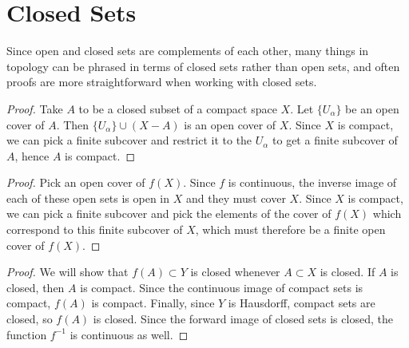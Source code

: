 


\section*{Closed Sets}

Since open and closed sets are complements of each other, many things in topology can be phrased in terms of closed sets rather than open sets, and often proofs are more straightforward when working with closed sets.


\begin{proof}
	Take $A$ to be a closed subset of a compact space $X$.  Let $\{U_\alpha\}$ be an open cover of $A$.  Then $\{U_\alpha\}\cup (X{-}A)$ is an open cover of $X$.  Since $X$ is compact, we can pick a finite subcover and restrict it to the $U_\alpha$ to get a finite subcover of $A$, hence $A$ is compact.
\end{proof}


\begin{proof}
	Pick an open cover of $f(X)$.  Since $f$ is continuous, the inverse image of each of these open sets is open in $X$ and they must cover $X$.  Since $X$ is compact, we can pick a finite subcover and pick the elements of the cover of $f(X)$ which correspond to this finite subcover of $X$, which must therefore be a finite open cover of $f(X)$.
	
\end{proof}



\begin{proof}
	We will show that $f(A)\subset Y$ is closed whenever $A\subset X$ is closed.  If $A$ is closed, then $A$ is compact.  Since the continuous image of compact sets is compact, $f(A)$ is compact.  Finally, since $Y$ is Hausdorff, compact sets are closed, so $f(A)$ is closed. Since the forward image of closed sets is closed, the function $f^{-1}$ is continuous as well.
\end{proof}


